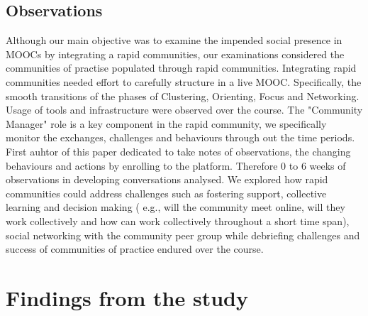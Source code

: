\documentclass[manuscript,screen,review]{acmart}
\begin{document}
\subsection{Observations}
Although our main objective was to examine the impended social presence in MOOCs by integrating a rapid communities, our examinations considered the communities of practise populated through rapid communities. Integrating rapid communities needed effort to carefully structure in a live MOOC. Specifically, the smooth transitions of the phases of Clustering, Orienting, Focus  and Networking. Usage of tools and infrastructure were observed over the course. The "Community Manager" role is a key component in the rapid community, we specifically monitor the exchanges, challenges and behaviours through out the time periods. First auhtor of this paper dedicated to take notes of observations, the changing behaviours and actions by enrolling to the platform. Therefore 0 to 6 weeks of observations in developing conversations analysed. We explored how rapid communities could address challenges such as  fostering support, collective learning and decision making ( e.g., will the community meet online, will they work collectively and how can work collectively throughout a short time span), social networking with the community peer group while debriefing challenges and success of communities of practice endured over the course. 

\section{Findings from the study}
\end{document}
